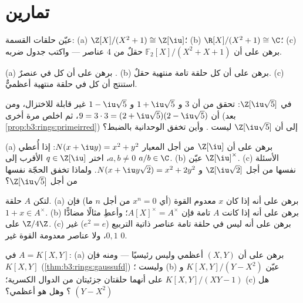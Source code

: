 \section{تمارين}

\begin{exercise}[$\star$]\label{exo:b3:rings:1}
عيّن حلقات القسمة: (a) $\Z[X]/(X^2 + 1) \cong \Z[\iu]$؛ (b) $\R[X]/(X^2+1) \cong \C$؛ (c) برهن على أن
$\mathbb F_2[X]/(X^2 + X + 1)$ حقلٌ من $4$ عناصر --- واكتب جدول ضربه.
\end{exercise}

\begin{exercise}[$\star$]\label{exo:b3:rings:2}
(a) برهن على أن كل  في 
عنصرٌ .
(b) برهن على أن كل حلقة تامة منتهية حقلٌ.
(c) استنتج أن كل  في حلقة منتهية أعظميٌّ.
\end{exercise}

\begin{exercise}[$\star$]\label{exo:b3:rings:3}
في $\Z[\iu\sqrt5]$: تحقق من أن $3$ و $1 + \iu\sqrt5$ و $1 -
\iu\sqrt5$
غير قابلة للاختزال، ومن أن $9 = 3\cdot 3 = (2 +
\iu\sqrt5)(2 - \iu\sqrt5)$، ثم اخلص مرة أخرى (بعد
\cref{prop:b3:rings:primeirred}) إلى أن $\Z[\iu\sqrt5]$ ليست . وأين
تخفق الوحدانية بالضبط؟
\end{exercise}

\begin{exercise}[$\star\star$]\label{exo:b3:rings:4}
(a) برهن على أن $\Z[\iu]$  من أجل المعيار $N(x + \iu y) =
x^2 + y^2$: إذا
أُعطي $a, b \neq 0$، اختر $q \in \Z[\iu]$ الأقرب إلى
$a/b \in \C$.
(b) عيّن $\Z[\iu]^\times$.
(c) الأسئلة نفسها من أجل $\Z[\iu\sqrt2]$ و $N(x + \iu y\sqrt2) =
x^2 + 2y^2$. ولماذا
تخفق الحجّة نفسها من أجل $\Z[\iu\sqrt5]$؟
\end{exercise}

\begin{exercise}[$\star\star$]\label{exo:b3:rings:5}
لتكن $A$ حلقة. (a) برهن على أنه إذا كان $x$ معدوم القوة (أي
$x^n = 0$ من أجل $n$ ما) فإن $1 + x \in A^\times$. (b) برهن على أنه إذا كانت
$A$ تامة فإن $A[X]^\times = A^\times$؛ وأعطِ مثالًا مضادًّا على $\Z/4\Z$.
(c) برهن على أنه ليس في حلقة تامة عناصر ذاتية التربيع
($e^2 = e$) غير $0, 1$، ولا عناصر معدومة القوة غير $0$.
\end{exercise}

\begin{exercise}[$\star\star$]\label{exo:b3:rings:6}
في $A = K[X, Y]$: (a) برهن على أن  $(X, Y)$ أعظمي وليس
رئيسيًا --- ومنه فإن $K[X,Y]$  (\cref{thm:b3:rings:gaussufd})
وليست ؛ (b) عيّن $K[X, Y]/(Y - X^2)$ و $K[X,Y]/(XY - 1)$ على أنهما
حلقتان جزئيتان من الدوال الكسرية؛ (c) هل $(Y - X^2)$ ؟ وهل
هو أعظمي؟
\end{exercise}


